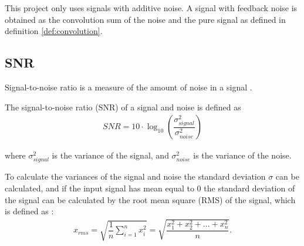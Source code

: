This project only uses signals with additive noise. A signal with feedback noise is obtained as the convolution sum of the noise and the pure signal as defined in definition \ref{def:convolution}.

\subsection{SNR}
Signal-to-noise ratio is a measure of the amount of noise in a signal \cite{page 229, DTSP}.
\begin{definition}
The signal-to-noise ratio (SNR) of a signal and noise is defined as
\begin{align} \label{def:SNR}
	SNR=10 \cdot \log_{10}\left(\dfrac{\sigma_{signal}^2}{\sigma_{noise}^2}\right)
\end{align}

where $\sigma_{signal}^2$ is the variance of the signal, and $\sigma_{noise}^2$ is the variance of the noise.
\end{definition}

To calculate the variances of the signal and noise the standard deviation $\sigma$ can be calculated, and if the input signal has mean equal to 0 the standard deviation of the signal can be calculated by the root mean square (RMS) of the signal, which is defined as \cite{page 228, DTSP}:
\begin{align} \label{eq:RMS}
	x_{rms} 
	=\sqrt{\dfrac{1}{n} \sum_{i=1}^n x_i^2}
	= \sqrt{\dfrac{x_1^2 + x_2^2 + \dots + x_n^2}{n}}.
\end{align}